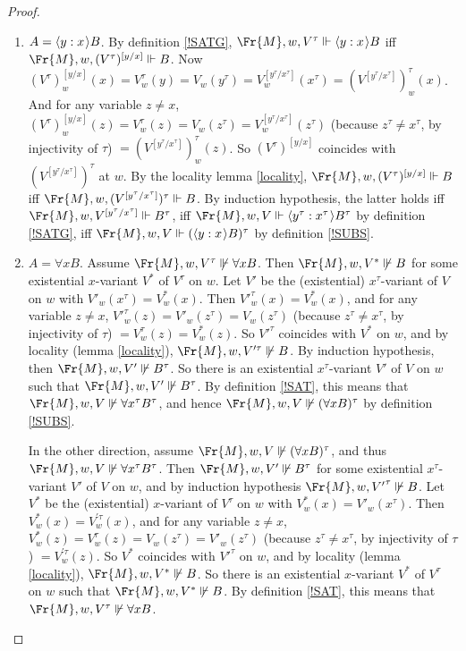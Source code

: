 \documentclass[11pt]{woarticle}
\theoremstyle{break}
\theoremstyle{nonumberplain}
\newcommand{\SAT}{\Vdash}
\newcommand{\1}{\;\,|\;\,}
\renewcommand{\t}[1]{\ensuremath{\langle #1  \makebox[.2ex]{}\rangle}}
\begin{document}
\begin{proof}
\begin{enumerate}
  \item $A = \t{y:x} B$.\; By definition \ref{!SATG}, $\Fr{M},w,V^\tau \SAT
    \t{y:x} B$ iff $\Fr{M},w,(V^\tau)^{[y/x]} \SAT B$. Now
    $(V^\tau)^{[y/x]}_w(x) = V^\tau_w(y) = V_w(y^\tau) =
    V^{[y^\tau/x^\tau]}_w(x^\tau) =
    (V^{[y^\tau/x^\tau]})^\tau_w(x)$. And for any variable $z \not=
    x$, $(V^\tau)^{[y/x]}_w(z) = V^\tau_w(z) = V_w(z^\tau) =
    V^{[y^\tau/x^\tau]}_w(z^\tau)$ (because $z^\tau \not= x^\tau$, by
    injectivity of $\tau$) $ = (V^{[y^\tau/x^\tau]})^\tau_w(z)$. So
    $(V^\tau)^{[y/x]}$ coincides with $(V^{[y^\tau/x^\tau]})^\tau$ at
    $w$. By the locality lemma \ref{locality}, $\Fr{M},w,(V^\tau)^{[y/x]}
    \SAT B$ iff $\Fr{M},w, (V^{[y^\tau/x^\tau]})^\tau \SAT B$. By induction
    hypothesis, the latter holds iff $\Fr{M},w,V^{[y^\tau/x^\tau]} \SAT
    B^\tau$, iff $\Fr{M},w,V \SAT \t{y^\tau:x^\tau}B^\tau$ by definition
    \ref{!SATG}, iff $\Fr{M},w,V \SAT (\t{y:x}B)^\tau$ by definition
    \ref{!SUBS}.

  \item $A = \forall x B$. Assume $\Fr{M},w,V^\tau \not\SAT \forall x
    B$. Then $\Fr{M},w,{V^*} \not\SAT B$ for some existential $x$-variant
    $V^*$ of $V^\tau$ on $w$. Let $V'$ be the (existential)
    $x^\tau$-variant of $V$ on $w$ with $V'_{w}(x^\tau) =
    V^*_{w}(x)$. Then ${V'}^\tau_w(x) = V^*_w(x)$, and for any
    variable $z \not= x$, ${V'}^\tau_w(z) = V'_w(z^\tau) =
    V_w(z^\tau)$ (because $z^\tau \not= x^\tau$, by injectivity of
    $\tau$) $ = V^\tau_w(z) = V^*_w(z)$. So ${V'}^\tau$ coincides with
    $V^*$ on $w$, and by locality (lemma \ref{locality}), $\Fr{M},w,V^{\prime
      \tau} \not\SAT B$. By induction hypothesis, then $\Fr{M},w,V' \not\SAT
    B^\tau$. So there is an existential $x^\tau$-variant $V'$ of $V$
    on $w$ such that $\Fr{M},w,V' \not\SAT B^\tau$. By definition \ref{!SAT},
    this means that $\Fr{M},w,V \not\SAT \forall x^\tau B^\tau$, and hence
    $\Fr{M},w,V \not\SAT (\forall x B)^\tau$ by definition \ref{!SUBS}.

    In the other direction, assume $\Fr{M},w,V \not\SAT (\forall x B)^\tau$,
    and thus $\Fr{M},w,V \not\SAT \forall x^\tau B^\tau$. Then $\Fr{M},w,V' \not\SAT
    B^\tau$ for some existential $x^\tau$-variant $V'$ of $V$ on $w$,
    and by induction hypothesis $\Fr{M},w,{V'}^\tau \not\SAT B$. Let $V^*$ be
    the (existential) $x$-variant of $V^\tau$ on $w$ with $V^*_{w}(x)
    = V'_{w}(x^\tau)$. Then $V^*_w(x) = V^{\prime \tau}_w(x)$, and for
    any variable $z \not= x$, $V^*_w(z) = V^\tau_w(z) = V_w(z^\tau) =
    V'_w(z^\tau)$ (because $z^\tau \not= x^\tau$, by injectivity of
    $\tau$) $ = V^{\prime \tau}_w(z)$. So $V^*$ coincides with
    ${V'}^\tau$ on $w$, and by locality (lemma \ref{locality}), $\Fr{M},w,V^*
    \not\SAT B$. So there is an existential $x$-variant ${V^*}$ of
    $V^\tau$ on $w$ such that $\Fr{M},w,V^* \not\SAT B$. By definition
    \ref{!SAT}, this means that $\Fr{M},w,V^\tau \not\SAT \forall x B$.


\end{enumerate}
\end{proof}
\end{document}
